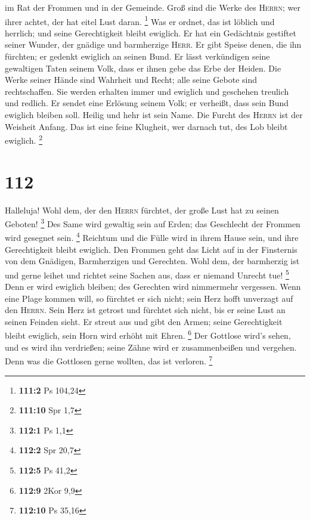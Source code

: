 im Rat der Frommen und in der Gemeinde.  Groß sind die
Werke des \textsc{Herrn}; wer ihrer achtet, der hat eitel Lust daran.
\footnote{\textbf{111:2} Ps 104,24}  Was er ordnet, das
ist löblich und herrlich; und seine Gerechtigkeit bleibt ewiglich.
 Er hat ein Gedächtnis gestiftet seiner Wunder, der
gnädige und barmherzige \textsc{Herr}.  Er gibt Speise
denen, die ihn fürchten; er gedenkt ewiglich an seinen Bund.
 Er lässt verkündigen seine gewaltigen Taten seinem Volk,
dass er ihnen gebe das Erbe der Heiden.  Die Werke seiner
Hände sind Wahrheit und Recht; alle seine Gebote sind rechtschaffen.
 Sie werden erhalten immer und ewiglich und geschehen
treulich und redlich.  Er sendet eine Erlösung seinem
Volk; er verheißt, dass sein Bund ewiglich bleiben soll. Heilig und hehr
ist sein Name.  Die Furcht des \textsc{Herrn} ist der
Weisheit Anfang. Das ist eine feine Klugheit, wer darnach tut, des Lob
bleibt ewiglich. \footnote{\textbf{111:10} Spr 1,7}

\hypertarget{section-35}{%
\section{112}\label{section-35}}

 Halleluja! Wohl dem, der den \textsc{Herrn} fürchtet, der
große Lust hat zu seinen Geboten! \footnote{\textbf{112:1} Ps 1,1}
 Des Same wird gewaltig sein auf Erden; das Geschlecht der
Frommen wird gesegnet sein. \footnote{\textbf{112:2} Spr 20,7}
 Reichtum und die Fülle wird in ihrem Hause sein, und ihre
Gerechtigkeit bleibt ewiglich.  Den Frommen geht das Licht
auf in der Finsternis von dem Gnädigen, Barmherzigen und Gerechten.
 Wohl dem, der barmherzig ist und gerne leihet und richtet
seine Sachen aus, dass er niemand Unrecht tue! \footnote{\textbf{112:5}
  Ps 41,2}  Denn er wird ewiglich bleiben; des Gerechten
wird nimmermehr vergessen.  Wenn eine Plage kommen will,
so fürchtet er sich nicht; sein Herz hofft unverzagt auf den
\textsc{Herrn}.  Sein Herz ist getrost und fürchtet sich
nicht, bis er seine Lust an seinen Feinden sieht.  Er
streut aus und gibt den Armen; seine Gerechtigkeit bleibt ewiglich, sein
Horn wird erhöht mit Ehren. \footnote{\textbf{112:9} 2Kor 9,9}
 Der Gottlose wird's sehen, und es wird ihn verdrießen;
seine Zähne wird er zusammenbeißen und vergehen. Denn was die Gottlosen
gerne wollten, das ist verloren. \footnote{\textbf{112:10} Ps 35,16}

